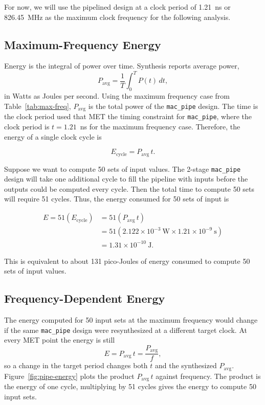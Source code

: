 \documentclass[a4paper,11pt]{article}
\begin{document}
For now, we will use the pipelined design at a clock period of 1.21~ns or 826.45~MHz as the maximum clock frequency for the following analysis.

\subsection{Maximum-Frequency Energy}

Energy is the integral of power over time. Synthesis reports average power,
\[
P_\mathrm{avg} = \frac{1}{T}\int_0^{T} P(t)\,dt,
\]
in Watts as Joules per second. Using the maximum frequency case from Table~\ref{tab:max-freq}, $P_\mathrm{avg}$ is the total power of the \texttt{mac\_pipe} design. The time is the clock period used that MET the timing constraint for \texttt{mac\_pipe}, where the clock period is $t = 1.21$~ns for the maximum frequency case. Therefore, the energy of a single clock cycle is 

\[
E_\mathrm{cycle} = P_\mathrm{avg}\,t.
\]


Suppose we want to compute 50 sets of input values. The 2-stage \texttt{mac\_pipe} design will take one additional cycle to fill the pipeline with inputs before the outputs could be computed every cycle. Then the total time to compute 50 sets will require 51 cycles. Thus, the energy consumed for 50 sets of input is

\begin{align*}
E = 51 (E_\mathrm{cycle}) &= 51 (P_\mathrm{avg}\,t) \\
&= 51 (2.122 \times 10^{-3}~\mathrm{W} \times 1.21 \times 10^{-9}~\mathrm{s}) \\
&= 1.31 \times 10^{-10}~\mathrm{J}.
\end{align*}

This is equivalent to about 131 pico-Joules of energy consumed to compute 50 sets of input values.

\subsection{Frequency-Dependent Energy}

The energy computed for 50 input sets at the maximum frequency would change if the same \texttt{mac\_pipe} design were resynthesized at a different target clock. At every MET point the energy is still
\[
E = P_\mathrm{avg}\,t = \frac{P_\mathrm{avg}}{f},
\]
so a change in the target period changes both $t$ and the synthesized $P_\mathrm{avg}$. Figure~\ref{fig:pipe-energy} plots the product $P_\mathrm{avg}\,t$ against frequency. The product is the energy of one cycle, multiplying by 51 cycles gives the energy to compute 50 input sets.
\end{document}
